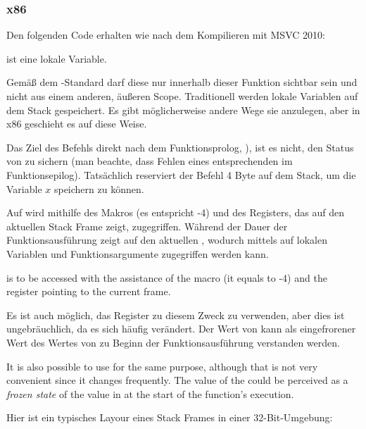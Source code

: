 \subsubsection{x86}

Den folgenden Code erhalten wie nach dem Kompilieren mit MSVC 2010:



 ist eine lokale Variable.

Gemäß dem \CCpp-Standard darf diese nur innerhalb dieser Funktion sichtbar sein und nicht aus einem anderen, äußeren Scope.
Traditionell werden lokale Variablen auf dem Stack gespeichert.
Es gibt möglicherweise andere Wege sie anzulegen, aber in x86 geschieht es auf diese Weise.


Das Ziel des Befehls direkt nach dem Funktionsprolog, ), ist es nicht, den Status von \ECX zu sichern
(man beachte, dass Fehlen eines entsprechenden  im Funktionsepilog).
Tatsächlich reserviert der Befehl 4 Byte auf dem Stack, um die Variable $x$ speichern zu können.

\label{stack_frame}
Auf  wird mithilfe des  Makros (es entspricht -4) und des \EBP Registers, das auf den aktuellen Stack Frame zeigt, zugegriffen. 
Während der Dauer der Funktionsausführung zeigt \EBP auf den aktuellen , wodurch mittels  auf lokalen Variablen und Funktionsargumente zugegriffen werden kann.

 is to be accessed with the assistance of the  macro (it equals to -4) and the \EBP register pointing to the current frame.

Es ist auch möglich, das \ESP Register zu diesem Zweck zu verwenden, aber dies ist ungebräuchlich, da es sich häufig verändert.
Der Wert von \EBP kann als eingefrorener Wert des Wertes von \ESP zu Beginn der Funktionsausführung verstanden werden.

It is also possible to use \ESP for the same purpose, although that is not very convenient since it changes frequently.
The value of the \EBP could be perceived as a \emph{frozen state} of the value in \ESP at the start of the function's execution.

Hier ist ein typisches Layour eines Stack Frames in einer 32-Bit-Umgebung:

